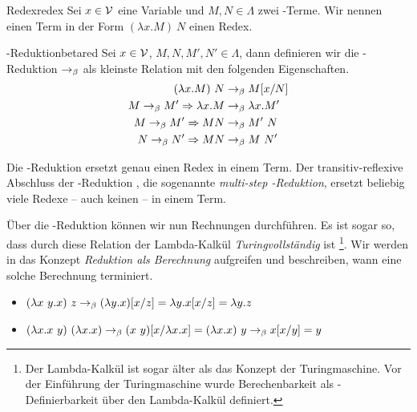 \begin{definition}{Redex}{redex}
    Sei $x\in\mathcal{V}$ eine Variable und $M, N\in\Lambda$ zwei \tlambda-Terme. Wir nennen einen Term in der Form $(\lambda x.M)~N$ einen Redex.
\end{definition}

\begin{definition}{\tbeta-Reduktion}{betared}
    Sei $x\in\mathcal{V}$, $M, N, M', N'\in\Lambda$, dann definieren wir die \tbeta-Reduktion $\rightarrow_\beta$ als kleinste Relation mit den folgenden Eigenschaften.
    \begin{align*}
    (\lambda x.M)~N&\rightarrow_\beta M[x/N]\\
    M\rightarrow_\beta M' \Rightarrow \lambda x.M&\rightarrow_\beta \lambda x.M'\\
    M\rightarrow_\beta M' \Rightarrow  M N&\rightarrow_\beta M'~N\\
    N\rightarrow_\beta N' \Rightarrow  M N&\rightarrow_\beta M~N'    
    \end{align*}
\end{definition}
\begin{remark}
    Die \tbeta-Reduktion ersetzt genau einen Redex in einem Term. Der transitiv-reflexive Abschluss der \tbeta-Reduktion \msbetared, die sogenannte \emph{multi-step \tbeta-Reduktion}, ersetzt beliebig viele Redexe -- auch keinen -- in einem Term.
\end{remark}
Über die \tbeta-Reduktion können wir nun Rechnungen durchführen. Es ist sogar so, dass durch diese Relation der Lambda-Kalkül \emph{Turingvollständig} ist \cite{churchturing}\footnote{Der Lambda-Kalkül ist sogar älter als das Konzept der Turingmaschine. Vor der Einführung der Turingmaschine wurde Berechenbarkeit als \tlambda-Definierbarkeit über den Lambda-Kalkül definiert\cite{churchturing}.}. Wir werden in  das Konzept \emph{Reduktion als Berechnung} aufgreifen und beschreiben, wann eine solche Berechnung terminiert.
\begin{example}{}{}
    \begin{itemize}
        \item $(\lambda x~y.x)~z\rightarrow_\beta (\lambda y.x)[x/z] = \lambda y.x[x/z] = \lambda y.z$
        \item $(\lambda x.x~y)~(\lambda x.x)\rightarrow_\beta (x~y)[x/\lambda x.x]= (\lambda x.x)~y \rightarrow_\beta x[x/y]=y$
    \end{itemize}
\end{example}
